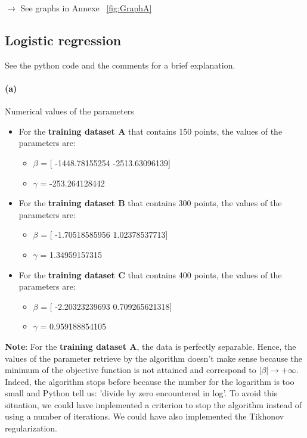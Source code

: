 \documentclass[11pt]{article}
\numberwithin{figure}{section} %
\begin{document}
$\rightarrow$ See graphs in Annexe ~\ref{fig:GraphA}

\subsection{Logistic regression}
See the python code and the comments for a brief explanation.

\paragraph{(a)} Numerical values of the parameters
\begin{itemize}
\item For the \textbf{training dataset A} that contains 150 points, the values of the parameters are:
	\begin{itemize}
		\item $\beta$ = [ -1448.78155254 -2513.63096139]
		\item $\gamma$ = -253.264128442
	\end{itemize}

\item For the \textbf{training dataset B} that contains 300 points, the values of the parameters are:
	\begin{itemize}
		\item $\beta$ = [ -1.70518585956 1.02378537713]
		\item $\gamma$ = 1.34959157315
	\end{itemize}

\item For the \textbf{training dataset C} that contains 400 points, the values of the parameters are:
	\begin{itemize}
		\item $\beta$ = [ -2.20323239693 0.709265621318]
		\item $\gamma$ = 0.959188854105
	\end{itemize}
\end{itemize}

\textbf{Note}: For the \textbf{training dataset A}, the data is perfectly separable. Hence, the values of the parameter retrieve by the algorithm doesn't make sense because the minimum of the objective function is not attained and correspond to $|\beta| \rightarrow + \infty$. Indeed, the algorithm stops before because the number for the logarithm is too small and Python tell us: {\color{red} 'divide by zero encountered in log'}. To avoid this situation, we could have implemented a criterion to stop the algorithm instead of using a number of iterations. We could have also implemented the Tikhonov regularization.
\end{document}
